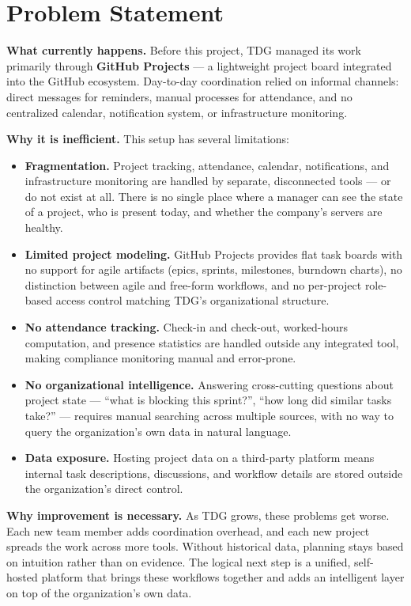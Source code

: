 \section{Problem Statement}

\textbf{What currently happens.} Before this project, TDG managed its work primarily through
\textbf{GitHub Projects} --- a lightweight project board integrated into the GitHub ecosystem.
Day-to-day coordination relied on informal channels: direct messages for reminders, manual
processes for attendance, and no centralized calendar, notification system, or infrastructure
monitoring.

\textbf{Why it is inefficient.} This setup has several limitations:

\begin{itemize}
  \item \textbf{Fragmentation.} Project tracking, attendance, calendar, notifications, and
    infrastructure monitoring are handled by separate, disconnected tools --- or do not exist
    at all. There is no single place where a manager can see the state of a project, who is
    present today, and whether the company's servers are healthy.
  \item \textbf{Limited project modeling.} GitHub Projects provides flat task boards with no
    support for agile artifacts (epics, sprints, milestones, burndown charts), no distinction
    between agile and free-form workflows, and no per-project role-based access control
    matching TDG's organizational structure.
  \item \textbf{No attendance tracking.} Check-in and check-out, worked-hours computation, and
    presence statistics are handled outside any integrated tool, making compliance monitoring
    manual and error-prone.
  \item \textbf{No organizational intelligence.} Answering cross-cutting questions about project
    state --- ``what is blocking this sprint?'', ``how long did similar tasks take?'' --- requires
    manual searching across multiple sources, with no way to query the organization's own data
    in natural language.
  \item \textbf{Data exposure.} Hosting project data on a third-party platform means internal
    task descriptions, discussions, and workflow details are stored outside the organization's
    direct control.
\end{itemize}

\textbf{Why improvement is necessary.} As TDG grows, these problems get worse. Each new team
member adds coordination overhead, and each new project spreads the work across more tools.
Without historical data, planning stays based on intuition rather than on evidence. The logical
next step is a unified, self-hosted platform that brings these workflows together and adds an
intelligent layer on top of the organization's own data.


